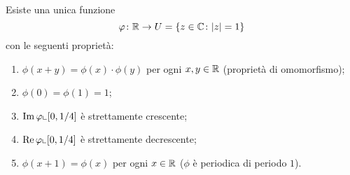 \begin{theorem}[omomorfismo su $U$]%
  \label{th:omomorfismo_U}%
Esiste una unica 
funzione 
\[
 \varphi\colon {\mathbb R} \to U={\left\{ z\in {\mathbb C}\colon {\left|z\right|} = 1 \right\}} 
\]
%
con le seguenti proprietà:
\begin{enumerate}
  \item $\phi(x+y) = \phi(x)\cdot \phi(y)$ per ogni $x,y\in{\mathbb R}$ (proprietà di omomorfismo);
  \item $\phi(0) = \phi(1) = 1$;
  \item $\operatorname{Im} \varphi\llcorner \left[0,1/4\right]$ è strettamente crescente;
  \item $\operatorname{Re} \varphi\llcorner \left[0,1/4\right]$ è strettamente decrescente;
  \item $\phi(x+1)=\phi(x)$ per ogni $x\in {\mathbb R}$ 
  ($\phi$ è periodica di periodo $1$).
\end{enumerate}
\end{theorem}
%
